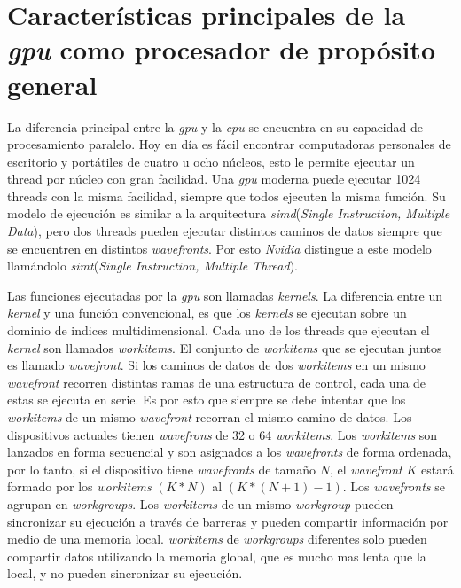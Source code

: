 
\section{Características principales de la \emph{gpu} como procesador de
propósito general}

La diferencia principal entre la \emph{gpu} y la \emph{cpu} se encuentra en su
capacidad de procesamiento paralelo. Hoy en día es fácil encontrar computadoras
personales de escritorio y portátiles de cuatro u ocho núcleos, esto le permite
ejecutar un thread por núcleo con gran facilidad. Una \emph{gpu} moderna puede
ejecutar 1024 threads con la misma facilidad, siempre que todos ejecuten la
misma función. Su modelo de ejecución es similar a la arquitectura
\emph{simd}(\emph{Single Instruction, Multiple Data}), pero dos threads pueden
ejecutar distintos caminos de datos siempre que se encuentren en distintos
\emph{wavefronts}. Por esto \emph{Nvidia} distingue a este modelo llamándolo
\emph{simt}(\emph{Single Instruction, Multiple Thread}).

Las funciones ejecutadas por la \emph{gpu} son llamadas \emph{kernels}. La
diferencia entre un \emph{kernel} y una función convencional, es que los
\emph{kernels} se ejecutan sobre un dominio de indices multidimensional. Cada
uno de los threads que ejecutan el \emph{kernel} son llamados \emph{workitems}.
El conjunto de \emph{workitems} que se ejecutan juntos es llamado
\emph{wavefront}. Si los caminos de datos de dos \emph{workitems} en un mismo
\emph{wavefront} recorren distintas ramas de una estructura de control, cada una
de estas se ejecuta en serie. Es por esto que siempre se debe intentar que los
\emph{workitems} de un mismo \emph{wavefront} recorran el mismo camino de datos.
Los dispositivos actuales tienen \emph{wavefrons} de 32 o 64 \emph{workitems}.
Los \emph{workitems} son lanzados en forma secuencial y son asignados a los
\emph{wavefronts} de forma ordenada, por lo tanto, si el dispositivo tiene
\emph{wavefronts} de tamaño $N$, el \emph{wavefront} $K$ estará formado por los
\emph{workitems} $(K*N)$ al $(K*(N+1)-1)$. Los \emph{wavefronts} se agrupan en
\emph{workgroups}. Los \emph{workitems} de un mismo \emph{workgroup} pueden
sincronizar su ejecución a través de barreras y pueden compartir información por
medio de una memoria local. \emph{workitems} de \emph{workgroups} diferentes
solo pueden compartir datos utilizando la memoria global, que es mucho mas lenta
que la local, y no pueden sincronizar su ejecución.

